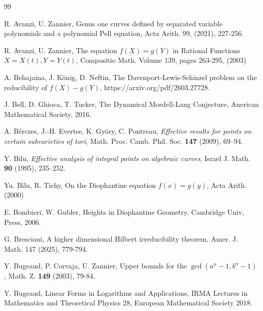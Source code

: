 \documentclass[leqno,12pt]{article} %
\theoremstyle{plain} %
\theoremstyle{definition} %
\begin{document}


\begin{thebibliography}{99}





 



 R. Avanzi, U. Zannier, Genus one curves defined by separated variable polynomials and a polynomial Pell equation, Acta Arith. 99, (2021), 227-256.\smallskip

 R. Avanzi, U. Zannier, The equation $f(X)=g(Y)$ in Rational Functions $X=X(t), Y=Y(t)$, Compositio Math. Volume 139, pages 263-295, (2003)\smallskip

\smallskip



 A. Behajaina, J. K\"onig, D. Neftin, The Davenport-Lewis-Schinzel problem on the reducibility of $f(X)-g(Y)$, https://arxiv.org/pdf/2603.27728.
\smallskip

 J. Bell, D. Ghioca, T. Tucker, The Dynamical Mordell-Lang Conjecture, Anerican Mathematical Society, 2016. \smallskip

 A. B\'erczes, J.-H. Evertse, K. Gy\"ory, C. Pontreau, {\it Effective results for points on certain subvarieties of tori}, Math. Proc. Camb. Phil. Soc. {\bf 147} (2009), 69--94.\smallskip


 Y. Bilu, {\it Effective analysis of integral points on algebraic curves}, Israel J. Math. {\bf 90} (1995), 235--252.\smallskip

 Yu. Bilu, R. Tichy, On the Diophantine equation $f(x)=g(y)$, Acta Arith. (2000)\smallskip

  E. Bombieri, W. Gubler, Heights in Diophantine Geometry, Cambridge Univ, Press, 2006.

\smallskip


   G. Bresciani, A higher dimensional Hilbert irreducibility theorem, Amer. J. Math. 147 (2025), 779-794.

\smallskip



   Y. Bugeaud, P. Corvaja, U. Zannier, Upper bounds for the $\gcd(a^n-1,b^n-1)$, Math. Z. {\bf 149} (2003), 79-84. \smallskip

\smallskip

 Y. Bugeaud, Linear Forms in Logarithms and Applications, IRMA Lectures in Mathematics and Theoretical Physics 28, European Mathematical Society 2018.


\end{thebibliography}
\end{document}

